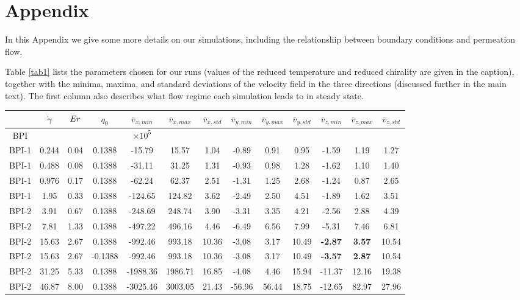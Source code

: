 \documentclass[8.5pt,twoside,twocolumn]{article}
\begin{document}
\appendix
\section*{Appendix}

In this Appendix we give some more details on our simulations,
including the relationship between boundary conditions and
permeation flow.

Table \ref{tab1} lists the parameters chosen for our runs (values of
the reduced temperature and reduced chirality are given in the caption),
together with the minima, maxima, and standard deviations of the velocity
field in the three directions (discussed further in the main text). 
The first column also describes what flow regime each simulation
leads to in steady state.

\begin{table}[htpb]
\begin{tabular}{|c||c|| c || c || c |c |c||c| c| c||c| c| c|}
\hline
& $\dot{\gamma}$ & ${\it Er}$ & $q_0$ & $\bar{v}_{x,min}$ & $\bar{v}_{x,max}$ & $\bar{v}_{x,std}$ & $\bar{v}_{y,min}$ & $\bar{v}_{y,max}$ & $\bar{v}_{y,std}$ & $\bar{v}_{z,min}$ & $\bar{v}_{z,max}$ & $\bar{v}_{z,std}$ \\
\hline
BPI & & & & $\times 10^5$\\
\hline
BPI-1 & 0.244 & 0.04& 0.1388 &-15.79 &15.57 &1.04 &-0.89 &0.91 &0.95 &-1.59 &1.19 &1.27 \\
BPI-1 & 0.488 & 0.08 & 0.1388 &-31.11 &31.25 &1.31 &-0.93 &0.98 &1.28 &-1.62 &1.10 &1.40 \\
BPI-1 & 0.976 & 0.17 & 0.1388 &-62.24 &62.37 &2.51 &-1.31 &1.25 &2.68 &-1.24 &0.87 &2.65 \\
BPI-1 & 1.95 & 0.33 & 0.1388 &-124.65 &124.82 &3.62&  -2.49 &2.50 &4.51 &-1.89 & 1.62 &3.51 \\
\hline
BPI-2 & 3.91 & 0.67 & 0.1388 &-248.69 &248.74 &3.90&  -3.31 &3.35 &4.21 &-2.56 & 2.88 &4.39 \\
BPI-2 & 7.81 & 1.33 & 0.1388 &-497.22 &496.16 &4.46 &-6.49 &6.56 &7.99 &-5.31 & 7.46 &6.81 \\ 
BPI-2 & 15.63 & 2.67 & 0.1388 &-992.46 &993.18 &10.36 &-3.08 &3.17 &10.49 &\bf{-2.87} & \bf{3.57} &10.54 \\
BPI-2 & 15.63 & 2.67 & -0.1388 &-992.46 &993.18 &10.36 &-3.08 &3.17 &10.49 &\bf{-3.57} & \bf{2.87} &10.54 \\
BPI-2 & 31.25 &5.33 & 0.1388 & -1988.36 &1986.71 &16.85 &-4.08 &4.46 &15.94 &-11.37 & 12.16 &19.38\\
BPI-2 & 46.87 & 8.00 & 0.1388 & -3025.46 & 3003.05 &21.43 & -56.96 & 56.44  & 18.75 & -12.65 & 82.97  & 27.96\\

\end{tabular}
\end{table}
\end{document}
